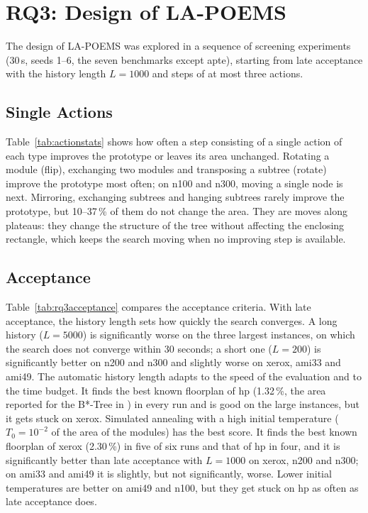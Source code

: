 \section{RQ3: Design of LA-POEMS}
\label{sec:rq3}

The design of LA-POEMS was explored in a sequence of screening experiments (30\,s, seeds 1--6, the seven benchmarks except apte), starting from late acceptance with the history length $L = 1000$ and steps of at most three actions.

\subsection{Single Actions}

Table~\ref{tab:actionstats} shows how often a step consisting of a single action of each type improves the prototype or leaves its area unchanged. Rotating a module (flip), exchanging two modules and transposing a subtree (rotate) improve the prototype most often; on n100 and n300, moving a single node is next. Mirroring, exchanging subtrees and hanging subtrees rarely improve the prototype, but 10--37\,\% of them do not change the area. They are moves along plateaus: they change the structure of the tree without affecting the enclosing rectangle, which keeps the search moving when no improving step is available.



\subsection{Acceptance}

Table~\ref{tab:rq3acceptance} compares the acceptance criteria. With late acceptance, the history length sets how quickly the search converges. A long history ($L = 5000$) is significantly worse on the three largest instances, on which the search does not converge within 30 seconds; a short one ($L = 200$) is significantly better on n200 and n300 and slightly worse on xerox, ami33 and ami49. The automatic history length adapts to the speed of the evaluation and to the time budget. It finds the best known floorplan of hp (1.32\,\%, the area reported for the B*-Tree in \cite{btree}) in every run and is good on the large instances, but it gets stuck on xerox. Simulated annealing with a high initial temperature ($T_0 = 10^{-2}$ of the area of the modules) has the best score. It finds the best known floorplan of xerox (2.30\,\%) in five of six runs and that of hp in four, and it is significantly better than late acceptance with $L = 1000$ on xerox, n200 and n300; on ami33 and ami49 it is slightly, but not significantly, worse. Lower initial temperatures are better on ami49 and n100, but they get stuck on hp as often as late acceptance does.

